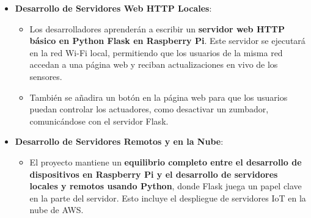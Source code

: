 \documentclass{report}
\begin{document}
\begin{itemize}
    \item \textbf{Desarrollo de Servidores Web HTTP Locales}:
    \begin{itemize}
        \item Los desarrolladores aprenderán a escribir un \textbf{servidor web HTTP básico en Python Flask en Raspberry Pi}. Este servidor 
        se ejecutará en la red Wi-Fi local, permitiendo que los usuarios de la misma red accedan a una página web y reciban actualizaciones 
        en vivo de los sensores.
        \item También se añadira un botón en la página web para que los usuarios puedan controlar los actuadores, como desactivar un zumbador, 
        comunicándose con el servidor Flask.
    \end{itemize}
    
    \item \textbf{Desarrollo de Servidores Remotos y en la Nube}:
    \begin{itemize}
        \item El proyecto mantiene un \textbf{equilibrio completo entre el desarrollo de dispositivos en Raspberry Pi y el desarrollo de 
        servidores locales y remotos usando Python}, donde Flask juega un papel clave en la parte del servidor. Esto incluye el despliegue 
        de servidores IoT en la nube de AWS.
    \end{itemize}


\end{itemize}
\end{document}

